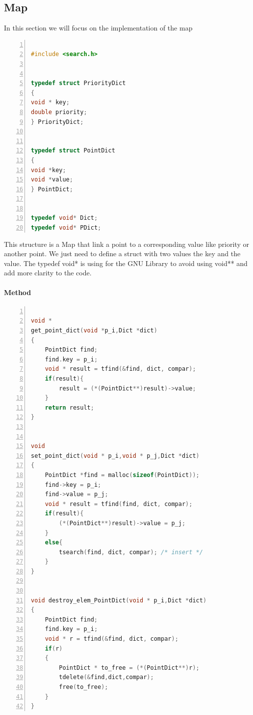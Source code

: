 \subsection{Map}
In this section we will focus on the implementation of the map

\begin{minipage}{\linewidth}
\begin{lstlisting}[language=C, % Spécifie le langage du code
caption={Map C implementation}, % Légende du listing
label=lst:map_c, % Étiquette pour référencer le listing
numbers=left,
numberstyle=\tiny\color{gray},
stepnumber=1,
frame=single,
breaklines=true,
postbreak=\mbox{\textcolor{red}{$\hookrightarrow$}\space},
showstringspaces=false
]

#include <search.h>


typedef struct PriorityDict
{
void * key;
double priority;
} PriorityDict;


typedef struct PointDict
{
void *key;
void *value;
} PointDict;


typedef void* Dict;
typedef void* PDict;

\end{lstlisting}
\end{minipage}

\vspace{1cm}
This structure is a Map that link a point to a corresponding value like priority or another point. We just need to define a struct with two values the key and the value. The typedef void* is using for the GNU Library to avoid using void** and add more clarity to the code.

\paragraph{Method}

\begin{minipage}{\linewidth}
\begin{lstlisting}[language=C, % Spécifie le langage du code
caption={Point Map Methods}, % Légende du listing
label=lst:pmap_c, % Étiquette pour référencer le listing
numbers=left,
numberstyle=\tiny\color{gray},
stepnumber=1,
frame=single,
breaklines=true,
postbreak=\mbox{\textcolor{red}{$\hookrightarrow$}\space},
showstringspaces=false
]

void *
get_point_dict(void *p_i,Dict *dict)
{
	PointDict find;
	find.key = p_i;
	void * result = tfind(&find, dict, compar);
	if(result){
		result = (*(PointDict**)result)->value;
	}
	return result;
}


void
set_point_dict(void * p_i,void * p_j,Dict *dict)
{
	PointDict *find = malloc(sizeof(PointDict));
	find->key = p_i;
	find->value = p_j;
	void * result = tfind(find, dict, compar);
	if(result){
		(*(PointDict**)result)->value = p_j;
	}
	else{
		tsearch(find, dict, compar); /* insert */
	}
}


void destroy_elem_PointDict(void * p_i,Dict *dict)
{
	PointDict find;
	find.key = p_i;
	void * r = tfind(&find, dict, compar);
	if(r)
	{
		PointDict * to_free = (*(PointDict**)r);
		tdelete(&find,dict,compar);
		free(to_free);
	}
}

\end{lstlisting}
\end{minipage}

